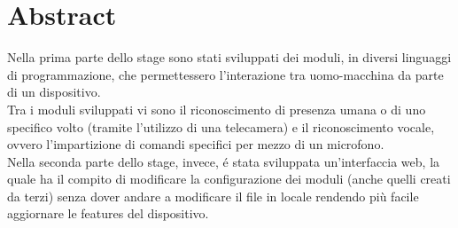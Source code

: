 \chapter*{Abstract}

Nella prima parte dello stage
sono stati sviluppati dei moduli, in diversi linguaggi di programmazione,
che permettessero l'interazione tra uomo-macchina da parte di un dispositivo.
\\[2\baselineskip]
Tra i moduli sviluppati vi sono il riconoscimento di presenza umana o di uno
specifico volto (tramite l'utilizzo di una telecamera) e il riconoscimento
vocale, ovvero l'impartizione di comandi specifici per mezzo di un microfono.
\\[2\baselineskip]
Nella seconda parte dello stage, invece,
\'e stata sviluppata un'interfaccia web, la quale ha il compito di modificare la configurazione
dei moduli (anche quelli creati da terzi) senza dover andare a modificare il
file in locale rendendo più facile aggiornare le features del dispositivo.
